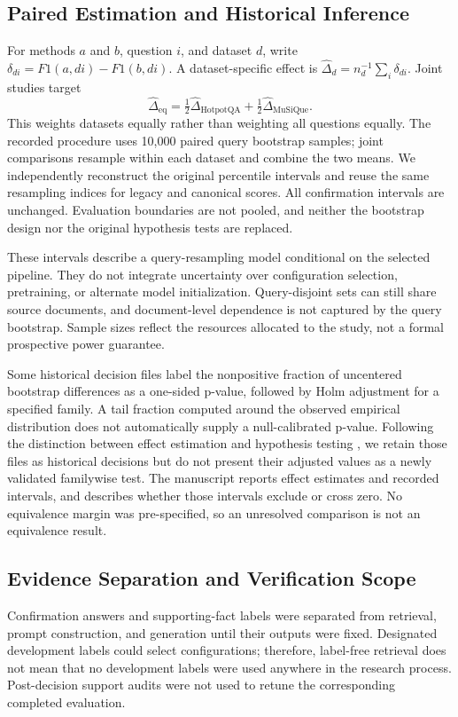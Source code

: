 \documentclass[11pt,a4paper]{article}
\begin{document}
\subsection{Paired Estimation and Historical Inference}
For methods $a$ and $b$, question $i$, and dataset $d$, write
$\delta_{di}=F1(a,di)-F1(b,di)$. A dataset-specific effect is
$\hat\Delta_d=n_d^{-1}\sum_i\delta_{di}$. Joint studies target
\begin{equation}
\hat\Delta_{\mathrm{eq}}=\tfrac12\hat\Delta_{\mathrm{HotpotQA}}
                       +\tfrac12\hat\Delta_{\mathrm{MuSiQue}}.
\end{equation}
This weights datasets equally rather than weighting all questions equally.
The recorded procedure uses 10,000 paired query bootstrap samples; joint
comparisons resample within each dataset and combine the two means. We
independently reconstruct the original percentile intervals and reuse the same
resampling indices for legacy and canonical scores. All confirmation
intervals are unchanged. Evaluation boundaries are not pooled, and neither
the bootstrap design nor the original hypothesis tests are replaced.

These intervals describe a query-resampling model conditional on the selected
pipeline. They do not integrate uncertainty over configuration selection,
pretraining, or alternate model initialization. Query-disjoint sets can still
share source documents, and document-level dependence is not captured by the
query bootstrap. Sample sizes reflect the resources allocated to the study,
not a formal prospective power guarantee.

Some historical decision files label the nonpositive fraction of uncentered
bootstrap differences as a one-sided p-value, followed by Holm adjustment for
a specified family. A tail fraction computed around the observed empirical
distribution does not automatically supply a null-calibrated p-value.
Following the distinction between effect estimation and hypothesis testing
\citep{dror2018hitchhiker}, we retain those files as historical decisions but
do not present their adjusted values as a newly validated familywise test.
The manuscript reports effect estimates and recorded intervals, and describes
whether those intervals exclude or cross zero. No equivalence margin was
pre-specified, so an unresolved comparison is not an equivalence result.

\subsection{Evidence Separation and Verification Scope}
Confirmation answers and supporting-fact labels were separated from retrieval,
prompt construction, and generation until their outputs were fixed.
Designated development labels could select configurations; therefore,
label-free retrieval does not mean that no development labels were used
anywhere in the research process. Post-decision support audits were not used
to retune the corresponding completed evaluation.
\end{document}
